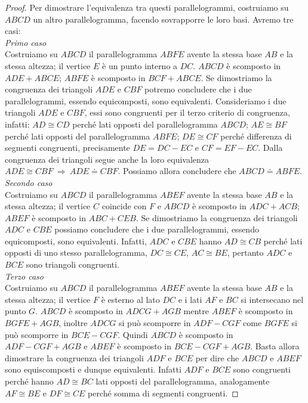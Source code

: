 \begin{proof}
Per dimostrare l'equivalenza tra questi parallelogrammi, costruiamo su $ABCD$ un altro parallelogramma, facendo sovrapporre le loro basi. Avremo tre casi:\\
\emph{Primo caso}\\
Costruiamo su $ABCD$ il parallelogramma $ABFE$ avente la stessa base $AB$ e la stessa altezza; il vertice $E$ è un punto interno a $DC$. $ABCD$ è scomposto in $ADE + ABCE$; $ABFE$ è scomposto in $BCF + ABCE$. Se dimostriamo la congruenza dei triangoli $ADE$ e $CBF$ potremo concludere che i due parallelogrammi, essendo equicomposti, sono equivalenti.
Consideriamo i due triangoli $ADE$ e $CBF$, essi sono congruenti per il terzo criterio di congruenza, infatti: $AD\cong CD$ perché lati opposti del parallelogramma $ABCD$; $AE\cong BF$ perché lati opposti del parallelogramma $ABFE$; $DE\cong CF$ perché differenza di segmenti congruenti, precisamente $DE=DC-EC$ e $CF=EF-EC$. Dalla congruenza dei triangoli segue anche la loro equivalenza $ADE\cong CBF \:\Rightarrow\: ADE\doteq CBF$. Possiamo allora concludere che $ABCD\doteq ABFE$.\\
\emph{Secondo caso}\\
Costruiamo su $ABCD$ il parallelogramma $ABEF$ avente la stessa base $AB$ e la stessa altezza; il vertice $C$ coincide con $F$ e $ABCD$ è scomposto in $ADC + ACB$; $ABEF$ è scomposto in $ABC + CEB$. Se dimostriamo la congruenza dei triangoli $ADC$ e $CBE$ possiamo concludere che i due parallelogrammi, essendo equicomposti, sono equivalenti. Infatti, $ADC$ e $CBE$ hanno $AD\cong CB$ perché lati opposti di uno stesso parallelogramma, $DC\cong CE$, $AC\cong BE$, pertanto $ADC$ e $BCE$ sono triangoli congruenti.\\
\emph{Terzo caso}\\
Costruiamo su $ABCD$ il parallelogramma $ABEF$ avente la stessa base $AB$ e la stessa altezza; il vertice $F$ è esterno al lato $DC$ e i lati $AF$ e $BC$ si intersecano nel punto $G$.
$ABCD$ è scomposto in $ADCG + AGB$ mentre $ABEF$ è scomposto in $BGFE + AGB$, inoltre $ADCG$ si può scomporre in $ADF - CGF$ come $BGFE$ si può scomporre in $BCE - CGF$.
Quindi $ABCD$ è scomposto in $ADF - CGF + AGB$ e $ABEF$ è scomposto in $BCE - CGF + AGB$.
Basta allora dimostrare la congruenza dei triangoli $ADF$ e $BCE$ per dire che $ABCD$ e $ABEF$ sono equiscomposti e dunque equivalenti. Infatti $ADF$ e $BCE$ sono congruenti perché hanno $AD\cong BC$ lati opposti del parallelogramma, analogamente $AF\cong BE$ e $DF\cong CE$ perché somma di segmenti congruenti.
\end{proof}

